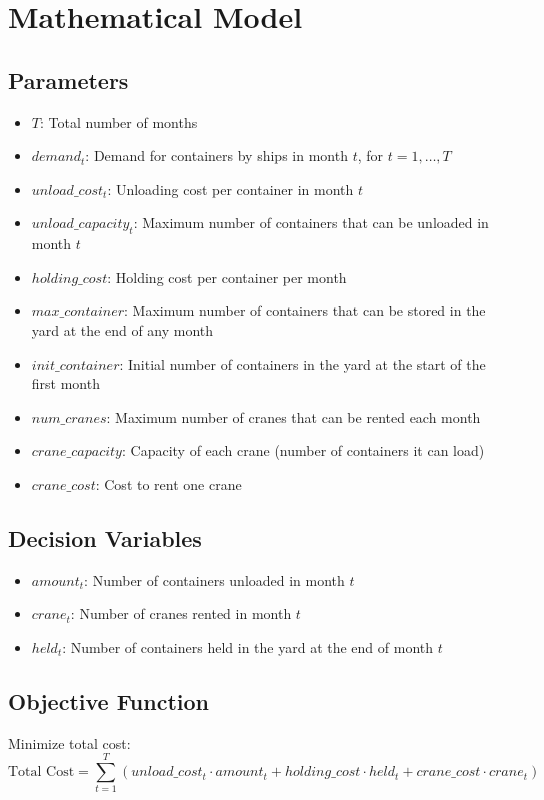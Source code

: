 \documentclass{article}
\begin{document}
\section*{Mathematical Model}

\subsection*{Parameters}
\begin{itemize}
    \item $T$: Total number of months
    \item $demand_t$: Demand for containers by ships in month $t$, for $t = 1, \ldots, T$
    \item $unload\_cost_t$: Unloading cost per container in month $t$
    \item $unload\_capacity_t$: Maximum number of containers that can be unloaded in month $t$
    \item $holding\_cost$: Holding cost per container per month
    \item $max\_container$: Maximum number of containers that can be stored in the yard at the end of any month
    \item $init\_container$: Initial number of containers in the yard at the start of the first month
    \item $num\_cranes$: Maximum number of cranes that can be rented each month
    \item $crane\_capacity$: Capacity of each crane (number of containers it can load)
    \item $crane\_cost$: Cost to rent one crane
\end{itemize}

\subsection*{Decision Variables}
\begin{itemize}
    \item $amount_t$: Number of containers unloaded in month $t$
    \item $crane_t$: Number of cranes rented in month $t$
    \item $held_t$: Number of containers held in the yard at the end of month $t$
\end{itemize}

\subsection*{Objective Function}
Minimize total cost:
\[
\text{Total Cost} = \sum_{t=1}^{T} \left( unload\_cost_t \cdot amount_t + holding\_cost \cdot held_t + crane\_cost \cdot crane_t \right)
\]
\end{document}
